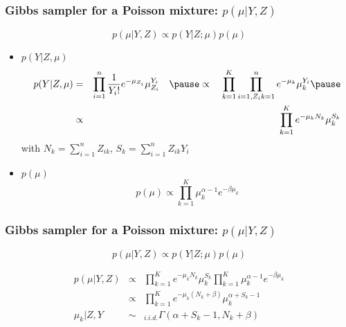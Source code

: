 \begin{frame}\frametitle{Gibbs sampler for a Poisson mixture: $p(\mu | Y,Z)$}
 
 $$p(\mu | Y,Z) \propto p(Y | Z;\mu)   p(\mu)$$
 
 \begin{itemize} 
  \item \vert $ p(Y | Z, \mu)$ \noir 
 \begin{eqnarray*}
p(Y|Z,\mu) &=& \prod_{i=1}^n \frac{1}{Y_i!}e^{- \mu_{Z_i}} \mu_{Z_i}^{Y_i}\quad \pause  \propto \quad \prod_{k=1}^K \prod_{i=1,  Z_ik = 1}^n e^{- \mu_{k}} \mu_{k}^{Y_i}\pause \\
&\propto&\prod_{k=1}^K e^{- \mu_{k}N_k}\mu_{k}^{S_k}
 \end{eqnarray*}
 with $N_k =\sum_{i=1}^nZ_{ik}$, $S_k = \sum_{i=1}^nZ_{ik}Y_i$ 
 
 \item \vert $p(\mu)$ \noir
 $$p(\mu) \propto \prod_{k=1}^K \mu_k^{\alpha-1} e^{-\beta \mu_k}$$
 
 \end{itemize}
 \end{frame}
 
\begin{frame}\frametitle{Gibbs sampler for a Poisson mixture: $p(\mu | Y,Z)$}
 
 $$p(\mu | Y,Z) \propto p(Y | Z;\mu)   p(\mu)$$
 
 
\begin{eqnarray*}
p(\mu | Y,Z) &\propto& \prod_{k=1}^K e^{- \mu_{k}N_k}\mu_{k}^{S_k}\prod_{k=1}^K \mu_k^{\alpha-1} e^{-\beta \mu_k}\\
&\propto& \prod_{k=1}^K e^{- \mu_{k}(N_k+\beta)}\mu_{k}^{\alpha + S_k-1}\\
\mu_k | Z,Y &\sim&_{i.i.d.} \Gamma(\alpha + S_k-1, N_k+\beta)
\end{eqnarray*}
 
\end{frame}
 
